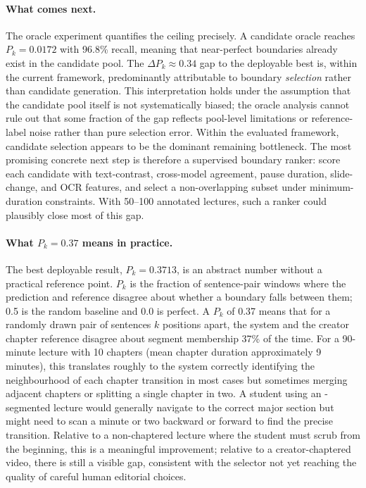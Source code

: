 \paragraph{What comes next.}
The oracle experiment quantifies the ceiling precisely. A candidate oracle
reaches $P_k=0.0172$ with 96.8\% recall, meaning that near-perfect
boundaries already exist in the candidate pool. The $\Delta
P_k\approx0.34$ gap to the deployable best is, within the current framework,
predominantly attributable to boundary \emph{selection} rather than
candidate generation. This interpretation holds under the assumption that the
candidate pool itself is not systematically biased; the oracle analysis
cannot rule out that some fraction of the gap reflects pool-level
limitations or reference-label noise rather than pure selection error.
Within the evaluated framework, candidate selection appears to be the
dominant remaining bottleneck.
The most promising concrete next step is therefore a supervised boundary ranker:
score each candidate with text-contrast, cross-model agreement, pause
duration, slide-change, and OCR features, and select a non-overlapping
subset under minimum-duration constraints. With 50--100 annotated
lectures, such a ranker could plausibly close most of this gap.

\paragraph{What $P_k = 0.37$ means in practice.}
The best deployable result, $P_k=0.3713$, is an abstract number without a
practical reference point.
$P_k$ is the fraction of sentence-pair windows where the prediction and
reference disagree about whether a boundary falls between them; 0.5 is the
random baseline and 0.0 is perfect.
A $P_k$ of 0.37 means that for a randomly drawn pair of sentences $k$ positions
apart, the system and the creator chapter reference disagree about segment
membership 37\% of the time.
For a 90-minute lecture with 10 chapters (mean chapter duration approximately
9 minutes), this translates roughly to the system correctly identifying the
neighbourhood of each chapter transition in most cases but sometimes merging
adjacent chapters or splitting a single chapter in two.
A student using an \lecseg{}-segmented lecture would generally navigate to the
correct major section but might need to scan a minute or two backward or
forward to find the precise transition.
Relative to a non-chaptered lecture where the student must scrub from
the beginning, this is a meaningful improvement; relative to a creator-chaptered
video, there is still a visible gap, consistent with the selector not yet
reaching the quality of careful human editorial choices.

